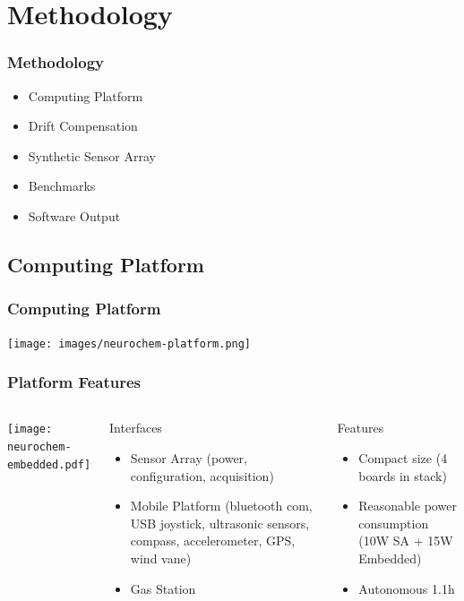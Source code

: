 \documentclass{beamer}
\begin{document}
\section{Methodology}

\begin{frame}
\frametitle{Methodology}
\begin{itemize}
  \item Computing Platform
  \item Drift Compensation
  \item Synthetic Sensor Array
  \item Benchmarks
  \item Software Output
\end{itemize}
\end{frame}

\subsection{Computing Platform}

\begin{frame}
\frametitle{Computing Platform}
\begin{center}
\texttt{[image: images/neurochem-platform.png]} \\
\end{center}
\end{frame}

\begin{frame}
  \frametitle{Platform Features}
  \begin{columns}
    \centering \texttt{[image: neurochem-embedded.pdf]}
    
    {\small 
    \begin{block}{Interfaces}
      \begin{itemize}
      \item Sensor Array   {\tiny (power, configuration, acquisition)}
      \item Mobile Platform   {\tiny (bluetooth com, USB joystick, ultrasonic sensors,
          compass, accelerometer, GPS, wind vane)}
      \item Gas Station 
     \end{itemize}   
    \end{block}
    \begin{block}{Features}
      \begin{itemize}
      \item Compact size  {\tiny (4 boards in stack)}
      \item Reasonable power consumption  {\tiny (10W SA + 15W Embedded)}
      \item Autonomous 1.1h 
      \end{itemize} 
    \end{block} 
} %
  \end{columns}
\end{frame}
\end{document}
